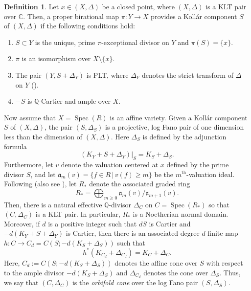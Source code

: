 \documentclass[11pt,reqno]{amsart}
\newcommand{\C}{\mathbb{C}}
\newcommand{\Q}{\mathbb{Q}}
\newcommand{\fa}{\mathfrak{a}}
\DeclareMathOperator{\Spec}{Spec}
\numberwithin{equation}{section}
\theoremstyle{definition}
\newtheorem{defi}[prop] {Definition}
\begin{document}
\begin{defi} \label{dfn:Kollarcomponent}
    Let $x \in (X, \Delta)$ be a closed point, where $(X, \Delta)$ is a KLT pair over $\C$. Then, a proper birational map $\pi: Y \to X$ provides a Koll\'ar component $S$ of $(X, \Delta)$ if the following conditions hold:
    \begin{enumerate}
        \item $S \subset Y$ is the unique, prime $\pi$-exceptional divisor on $Y$ and $\pi(S) = \{x\}$. 
        \item $\pi$ is an isomorphism over $X \setminus \{x\}$.
        \item The pair $(Y, S + \Delta_Y)$ is PLT, where $\Delta_Y$ denotes the strict transform of $\Delta$ on $Y$ ().
        \item $-S$ is $\Q$-Cartier and ample over $X$.
    \end{enumerate}
\end{defi}

Now assume that $X = \Spec(R)$ is an affine variety. Given a Koll\'ar component $S$ of $(X, \Delta)$, the pair $(S, \Delta_S)$ is a projective, log Fano pair of one dimension less than the dimension of $(X, \Delta)$. Here $\Delta_S$ is defined by the adjunction formula
\[ (K_Y + S + \Delta_Y)|_{S} = K_S + \Delta_S.  \]
Furthermore, let $v$ denote the valuation centered at $x$ defined by the prime divisor $S$, and let $\mathfrak{a}_m (v) = \{f \in R \, | \, v(f) \geq m \}$ be the $m^{\text{th}}$-valuation ideal. Following \cite[Section 2.4]{LiXuStabilityofvaluations} (also see \cite[Section 2.4]{LiuZhuangSharpnessofTianscriterion}), let $R_{*}$ denote the associated graded ring
\[ R_* = \bigoplus_{m \geq 0} \fa_m(v)/\fa_{m+1}(v). \]
Then, there is a natural effective $\Q$-divisor $\Delta_C$ on $C = \Spec(R_*)$ so that $(C, \Delta_C)$ is a KLT pair. In particular, $R_*$ is a Noetherian normal domain. Moreover, if $d$ is a positive integer such that $dS$ is Cartier and $-d(K_Y + S + \Delta_Y)$ is Cartier, then there is an associated degree $d$ finite map $h: C \to C_d = C (S; -d(K_S + \Delta_S))$ such that
\begin{equation} \label{eqn:orbifoldconepullback} h^* (K_{C_d} + \Delta_{C_d}) = K_C + \Delta _C. \end{equation}
Here, $C_d := C(S; -d(K_S + \Delta_S))$ denotes the affine cone over $S$ with respect to the ample divisor $-d(K_S + \Delta_S)$ and $\Delta_{C_d}$ denotes the cone over $\Delta_S$. Thus, we say that $(C, \Delta_C)$ is the \emph{orbifold cone} over the log Fano pair $(S, \Delta_S)$.
\end{document}
